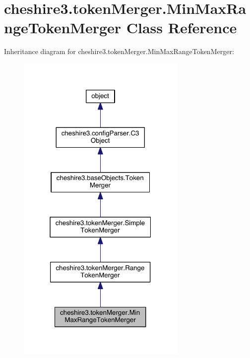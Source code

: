 \hypertarget{classcheshire3_1_1token_merger_1_1_min_max_range_token_merger}{\section{cheshire3.\-token\-Merger.\-Min\-Max\-Range\-Token\-Merger Class Reference}
\label{classcheshire3_1_1token_merger_1_1_min_max_range_token_merger}
}


Inheritance diagram for cheshire3.\-token\-Merger.\-Min\-Max\-Range\-Token\-Merger\-:
\nopagebreak
\begin{figure}[H]
\begin{center}
\leavevmode
\includegraphics[width=232pt]{classcheshire3_1_1token_merger_1_1_min_max_range_token_merger__inherit__graph}
\end{center}
\end{figure}


